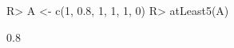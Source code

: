 \begin{Schunk}
% --begin: "quant2"
\begin{Sinput}
R> A <- c(1, 0.8, 1, 1, 1, 0)
R> atLeast5(A)
\end{Sinput}
\begin{Soutput}
[1] 0.8
\end{Soutput}
%
% --end: "quant2"
\end{Schunk}
